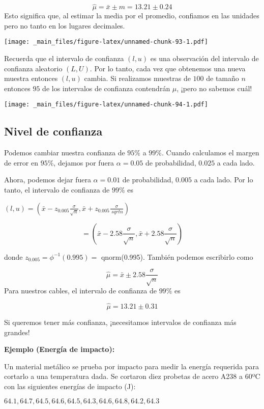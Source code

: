 \documentclass[
]{book}
\begin{document}
\[\hat{\mu}=\bar{x} \pm m = 13.21 \pm 0.24\]
Esto significa que, al estimar la media por el promedio, confiamos en las unidades pero no tanto en los lugares decimales.

\texttt{[image: \_main\_files/figure-latex/unnamed-chunk-93-1.pdf]}

Recuerda que el intervalo de confianza \((l,u)\) es una observación del intervalo de confianza aleatorio \((L,U)\). Por lo tanto, cada vez que obtenemos una nueva muestra entonces \((l,u)\) cambia. Si realizamos muestras de \(100\) de tamaño \(n\) entonces \(95%
\) de los intervalos de confianza contendrán \(\mu\), ¡pero no sabemos cuál!

\texttt{[image: \_main\_files/figure-latex/unnamed-chunk-94-1.pdf]}

\hypertarget{nivel-de-confianza}{%
\subsection{Nivel de confianza}\label{nivel-de-confianza}}

Podemos cambiar nuestra confianza de \(95\%\) a \(99\%\). Cuando calculamos el margen de error en \(95\%\), dejamos por fuera \(\alpha=0.05\) de probabilidad, \(0.025\) a cada lado.

Ahora, podemos dejar fuera \(\alpha=0.01\) de probabilidad, \(0.005\) a cada lado. Por lo tanto, el intervalo de confianza de \(99\%\) es

\((l,u) = (\bar{x} - z_{0.005}\frac{\sigma}{\sqrt{n}},\bar{x} + z_{0.005}\frac{\sigma}{\ sqrt{n}})\)

\[= (\bar{x} - 2.58\frac{\sigma}{\sqrt{n}},\bar{x} + 2.58\frac{\sigma}{\sqrt{n}})\]

donde \(z_{0.005}=\phi^{-1}(0.995)=\) qnorm(0.995). También podemos escribirlo como

\[\hat{\mu}=\bar{x} \pm 2.58\frac{\sigma}{\sqrt{n}}\]
Para nuestros cables, el intervalo de confianza de \(99\%\) es

\[\hat{\mu}= 13.21 \pm 0.31\]

Si queremos tener más confianza, ¡necesitamos intervalos de confianza más grandes!

\textbf{Ejemplo (Energía de impacto):}

Un material metálico se prueba por impacto para medir la energía requerida para cortarlo a una temperatura dada. Se cortaron diez probetas de acero A238 a 60ºC con las siguientes energías de impacto (J):

\(64.1, 64.7, 64.5, 64.6, 64.5, 64.3, 64.6, 64.8, 64.2, 64.3\)
\end{document}
